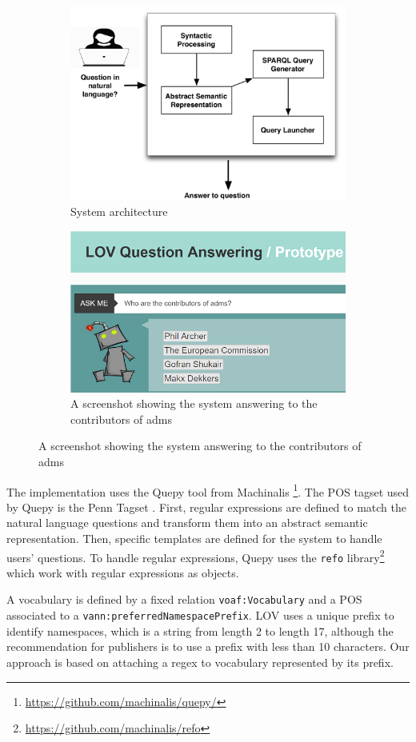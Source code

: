 \documentclass[runningheads,a4paper]{llncs}
\newcommand{\todo}[1]{\noindent\textcolor{red}{{\bf \{TODO}: #1{\bf \}}}}
\begin{document}
\begin{figure}[ht!b]
\centering
\begin{subfigure}
  \centering
  \includegraphics[width=.4\linewidth]{img/qa4lov-archi.png}
  \caption{System architecture}
  \label{fig:q4lovarchi}
\end{subfigure}%
\begin{subfigure}
  \centering
  \includegraphics[width=.5\linewidth]{img/qa-screenshot.png}
  \caption{A screenshot showing the system answering to the contributors of adms}
  \label{fig:qa-screenshot}
\end{subfigure}
\label{fig:test}
\end{figure}




The implementation uses the Quepy tool from Machinalis \footnote{\url{https://github.com/machinalis/quepy/}}. The POS tagset used by Quepy is the Penn Tagset \cite{marcus1993building}. First, regular expressions are defined to match the natural language questions and transform them into an abstract semantic representation. Then, specific templates are defined for the system to handle users' questions. To handle regular expressions, Quepy uses the \texttt{refo} library\footnote{\url{https://github.com/machinalis/refo}} which work with regular expressions as objects. 

A vocabulary is defined by a fixed relation \texttt{voaf:Vocabulary} and a POS associated to a \texttt{vann:preferredNamespacePrefix}. LOV uses a unique prefix to identify namespaces, which is a string from length 2 to length 17, although the recommendation for publishers is to use a prefix with less than 10 characters. Our approach is based on attaching a regex to vocabulary represented by its prefix.
\end{document}
